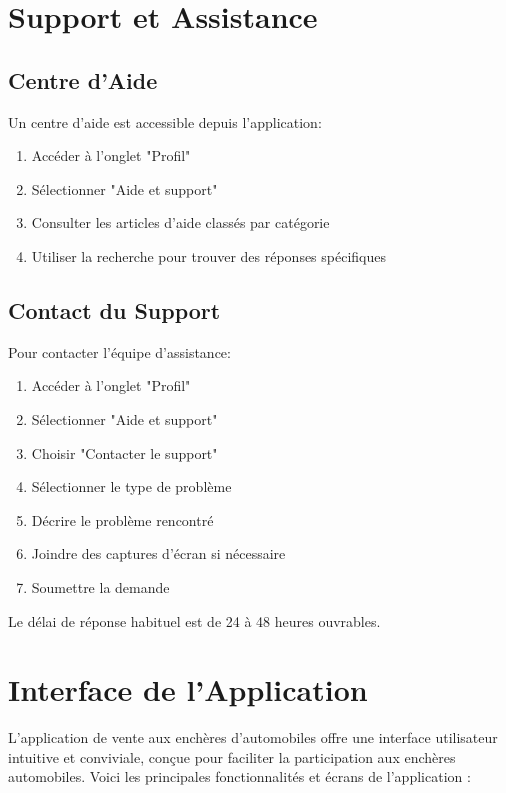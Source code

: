 \section{Support et Assistance}

\subsection{Centre d'Aide}

Un centre d'aide est accessible depuis l'application:

\begin{enumerate}
    \item Accéder à l'onglet "Profil"
    \item Sélectionner "Aide et support"
    \item Consulter les articles d'aide classés par catégorie
    \item Utiliser la recherche pour trouver des réponses spécifiques
\end{enumerate}

\subsection{Contact du Support}

Pour contacter l'équipe d'assistance:

\begin{enumerate}
    \item Accéder à l'onglet "Profil"
    \item Sélectionner "Aide et support"
    \item Choisir "Contacter le support"
    \item Sélectionner le type de problème
    \item Décrire le problème rencontré
    \item Joindre des captures d'écran si nécessaire
    \item Soumettre la demande
\end{enumerate}

Le délai de réponse habituel est de 24 à 48 heures ouvrables.

\section{Interface de l'Application}

L'application de vente aux enchères d'automobiles offre une interface utilisateur intuitive et conviviale, conçue pour faciliter la participation aux enchères automobiles. Voici les principales fonctionnalités et écrans de l'application :

